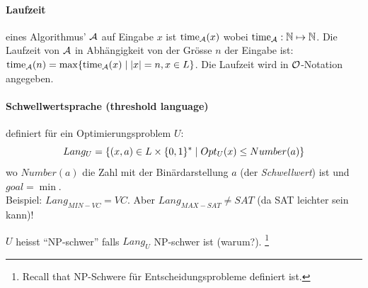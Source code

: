 \paragraph{Laufzeit}
eines Algorithmus' $\mathcal{A}$ auf Eingabe $x$ ist $\text{time}_{\mathcal{A}} (x)$
wobei $\text{time}_{\mathcal{A}}: \mathbb{N} \mapsto \mathbb{N}$.
Die Laufzeit von $\mathcal{A}$ in Abhängigkeit von der Grösse $n$ der Eingabe ist:
$\text{time}_{\mathcal{A}} (n) = \max \{ \text{time}_{\mathcal{A}} (x) \; | \; |x| = n, x \in L \}$.
Die Laufzeit wird in  $\mathcal{O}$-Notation angegeben.

\paragraph{Schwellwertsprache (threshold language)} definiert für ein Optimierungsproblem $U$:
$$ Lang_U = \{ (x, a) \in L \times \lbrace 0, 1 \rbrace^* \; | \; Opt_U(x) \leq Number(a) \} $$
wo $Number(a)$ die Zahl mit der Binärdarstellung $a$ (der \emph{Schwellwert}) ist und $goal = \min$.
\\
Beispiel: $Lang_{MIN-VC} = VC$. Aber $Lang_{MAX-SAT} \neq SAT$ (da SAT leichter sein kann)!

$U$ heisst ``NP-schwer'' falls $Lang_U$ NP-schwer ist (warum?).%
\footnote{Recall that NP-Schwere für Entscheidungsprobleme definiert ist.}




